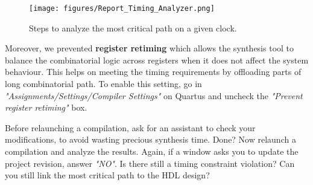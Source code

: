 \begin{figure}[h]
    \centering
    \texttt{[image: figures/Report\_Timing\_Analyzer.png]}
    \caption{Steps to analyze the most critical path on a given clock.}
    \label{fig:report_timing_analyzer}
\end{figure}

Moreover, we prevented \textbf{register retiming} which allows the synthesis tool to balance the combinatorial logic across registers when it does not affect the system behaviour. This helps on meeting the timing requirements by offloading parts of long combinatorial path. To enable this setting, go in \textit{"Assignments/Settings/Compiler Settings"} on Quartus and uncheck the \textit{"Prevent register retiming"} box.

Before relaunching a compilation, ask for an assistant to check your modifications, to avoid wasting precious synthesis time. Done? Now relaunch a compilation and analyze the results. Again, if a window asks you to update the project revision, answer \textit{"NO"}. Is there still a timing constraint violation? Can you still link the most critical path to the HDL design?

